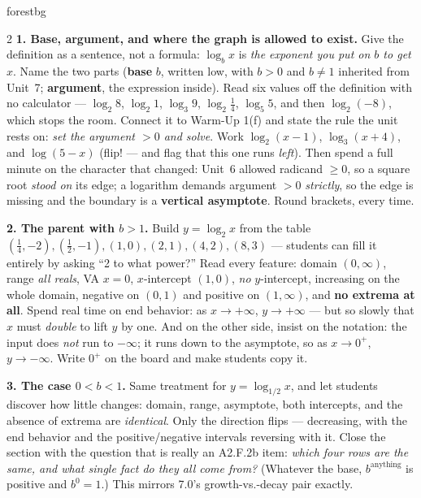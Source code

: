 \documentclass[10pt]{article}
\begin{document}
\begin{skillbox}[Lesson]{forestbg}
\begin{multicols}{2}
\textbf{1. Base, argument, and where the graph is allowed to exist.} Give the definition as a
sentence, not a formula: $\log_b x$ is \emph{the exponent you put on $b$ to get $x$}. Name the two
parts (\textbf{base} $b$, written low, with $b>0$ and $b\ne1$ inherited from Unit~7; \textbf{argument},
the expression inside). Read six values off the definition with no calculator --- $\log_2 8$,
$\log_2 1$, $\log_3 9$, $\log_2\frac14$, $\log_5 5$, and then $\log_2(-8)$, which stops the room.
Connect it to Warm-Up 1(f) and state the rule the unit rests on: \emph{set the argument $>0$ and
solve}. Work $\log_2(x-1)$, $\log_3(x+4)$, and $\log(5-x)$ (flip! --- and flag that this one runs
\emph{left}). Then spend a full minute on the character that changed: Unit~6 allowed radicand $\ge0$,
so a square root \emph{stood on} its edge; a logarithm demands argument $>0$ \emph{strictly}, so the
edge is missing and the boundary is a \textbf{vertical asymptote}. Round brackets, every time.

\textbf{2. The parent with $b>1$.} Build $y=\log_2 x$ from the table
$(\frac14,-2),(\frac12,-1),(1,0),(2,1),(4,2),(8,3)$ --- students can fill it entirely by asking ``2 to
what power?'' Read every feature: domain $(0,\infty)$, range \emph{all reals}, VA $x=0$, $x$-intercept
$(1,0)$, \emph{no} $y$-intercept, increasing on the whole domain, negative on $(0,1)$ and positive on
$(1,\infty)$, and \textbf{no extrema at all}. Spend real time on end behavior: as $x\to+\infty$,
$y\to+\infty$ --- but so slowly that $x$ must \emph{double} to lift $y$ by one. And on the other side,
insist on the notation: the input does \emph{not} run to $-\infty$; it runs down to the asymptote, so
as $x\to 0^{+}$, $y\to-\infty$. Write $0^{+}$ on the board and make students copy it.

\columnbreak

\textbf{3. The case $0<b<1$.} Same treatment for $y=\log_{1/2}x$, and let students discover how
little changes: domain, range, asymptote, both intercepts, and the absence of extrema are
\emph{identical}. Only the direction flips --- decreasing, with the end behavior and the
positive/negative intervals reversing with it. Close the section with the question that is really an
A2.F.2b item: \emph{which four rows are the same, and what single fact do they all come from?}
(Whatever the base, $b^{\text{anything}}$ is positive and $b^0=1$.) This mirrors 7.0's growth-vs.-decay
pair exactly.


\end{multicols}
\end{skillbox}
\end{document}
